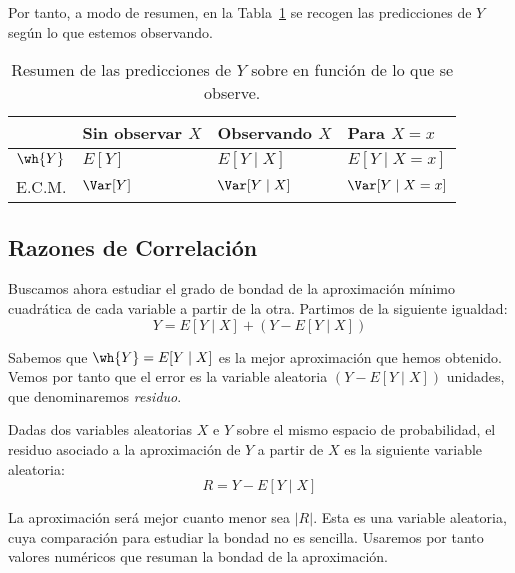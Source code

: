 Por tanto, a modo de resumen, en la Tabla~\ref{tab:resumen_regresion} se recogen las predicciones de $Y$ según lo que estemos observando.
\begin{table}[H]
    \centering
    \begin{tabular}{>{\centering\arraybackslash}m{3cm} |>{\centering\arraybackslash}m{3cm} >{\centering\arraybackslash}m{3cm} >{\centering\arraybackslash}m{3cm}}
        \toprule
        & Sin observar $X$ & Observando $X$ & Para $X=x$\\
        \midrule
        $\wh{Y}$ & $E[Y]$ & $E[Y\mid X]$ & $E[Y\mid X=x]$\\
        E.C.M. & $\Var[Y]$ & $\Var[Y\mid X]$ & $\Var[Y\mid X=x]$\\
        \bottomrule
    \end{tabular}
    \caption{Resumen de las predicciones de $Y$ sobre en función de lo que se observe.}
    \label{tab:resumen_regresion}
\end{table}


\subsection{Razones de Correlación}

Buscamos ahora estudiar el grado de bondad de la aproximación mínimo cuadrática de cada variable a partir de la otra. Partimos de la siguiente igualdad:
\begin{equation*}
    Y = E[Y\mid X] + (Y - E[Y\mid X])
\end{equation*}

Sabemos que $\wh{Y}=E[Y\mid X]$ es la mejor aproximación que hemos obtenido. Vemos por tanto que el error es la variable aleatoria $(Y - E[Y\mid X])$ unidades, que denominaremos \emph{residuo}.
\begin{definicion}[Residuo]
    Dadas dos variables aleatorias $X$ e $Y$ sobre el mismo espacio de probabilidad, el residuo asociado a la aproximación de $Y$ a partir de $X$ es la siguiente variable aleatoria:
    \begin{equation*}
        R = Y - E[Y\mid X]
    \end{equation*}
\end{definicion}

La aproximación será mejor cuanto menor sea $|R|$. Esta es una variable aleatoria, cuya comparación para estudiar la bondad no es sencilla. Usaremos por tanto valores numéricos que resuman la bondad de la aproximación. 

